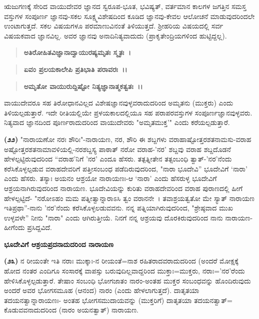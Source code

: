 
ಋಜುಗಣಕ್ಕೆ ಸೇರಿದ ವಾಯುದೇವರ ಜ್ಞಾನದ ಸ್ವರೂಪ-ಭೂತ, ಭವಿಷ್ಯತ್, ವರ್ತಮಾನ ಕಾಲಗಳ ಜಗತ್ತಿನ ಸಮಸ್ತ ವಸ್ತುಗಳ ಸಂಪೂರ್ಣ ಜ್ಞಾನವು-ಸಕಲ ಸೂಕ್ಷ್ಮವಿಶೇಷದಿಂದ ಕೂಡಿದ ಜ್ಞಾನವು-ಕೇವಲ ಆಲೋಚನೆ ಮಾಡುವುದರಿಂದಲೇ ಉಂಟಾಗುತ್ತದೆ. ಸಕಲ ವಿಷಯಗಳೂ ಪರಮಾಣುವಿನಂತೆ ತಿಳಿಯುತ್ತದೆ. ಶ‍್ರೀಹರಿಯ ವಿಷಯದಲ್ಲಿ ಸರ್ವ ವಿಷಯಕವಾದ ಜ್ಞಾನವಿಲ್ಲ. ಅವರ ಜ್ಞಾನವು ಅನಾದಿನಿತ್ಯವಾದುದು (ಪ್ರಾಕೃತೇಂದ್ರಿಯಗಳಿಂದ ಹುಟ್ಟಿದ್ದಲ್ಲ).

\begin{verse}
\textbf{ಅತಿರೋಹಿತವಿಜ್ಞಾನಾದ್ವಾಯುರಷ್ಯಮೃತಃ ಸ್ಮೃತಃ~।}
\end{verse}


\begin{verse}
\textbf{ಏವಂ ಪ್ರಲಯಕಾಲೇಪಿ ಪ್ರತಿಭಾತಿ ಪರಾವರಃ~।।}
\end{verse}


\begin{verse}
\textbf{ಅಮೃತೋ ವಾಯುರುದ್ದಿಷ್ಟೋ ನಿತ್ಯಜ್ಞಾನಾತ್ಮಕತ್ವತಃ~।।}
\end{verse}


\noindent
ವಾಯುದೇವರೂ ಸಹ ತಿರೋಧಾನವಿಲ್ಲದ ವಿಶೇಷಜ್ಞಾನವುಳ್ಳವರಾದುದರಿಂದ ಅಮೃತನು (ಮುಕ್ತರು) ಎಂದು ತಿಳಿಯಲ್ಪಡುತ್ತಾರೆ. ಇದೇ ರೀತಿಯಲ್ಲಿಯೇ ಪ್ರಳಯಕಾಲದಲ್ಲಿಯೂ ಸಹ ಪರಾಪರವಸ್ತುಗಳ ಸಂಪೂರ್ಣಜ್ಞಾನವುಳ್ಳವರು. ನಿತ್ಯವಾದ ಜ್ಞಾನದಿಂದ ಪೂರ್ಣರಾದುದರಿಂದ ವಾಯುದೇವರು "ಅಮೃತಮುಕ್ತ'" ಎಂದು ಕರೆಯಲ್ಪಡುತ್ತಾರೆ.

\textbf{(೨೨)} "ನಾರಾಯಣೋ ನರಃ ಶೌರಿಃ"-ನಾರಾಯಣ, ನರ, ಶೌರಿ ಈ ಶಬ್ದಗಳು ವರಾಹಾಷ್ಟೋತ್ತರಶತನಾಮಸು-ವರಾಹ ಅಷ್ಟೋತ್ತರಶತನಾಮಾವಳಿಯಲ್ಲಿ-ನರಶಬ್ದಸ್ಯ ಪಾಠಾತ್ ನರೋ ವರಾಹ-'ನರ' ಶಬ್ದವು ವರಾಹ ಶಬ್ದದೊಡನೆ ಹೇಳಲ್ಪಟ್ಟಿರುವುದರಿಂದ “ವರಾಹ'ನಿಗೆ 'ನರ' ಎಂದೂ ಹೆಸರು. ತತ್ಪತ್ನೀತೇನ ತತ್ಸಂಬಂಧಿ ತ್ವಾತ್-'ನರ'ನೆಂದು ಕರೆಸಿಕೊಳ್ಳಲ್ಪಡುವ ವರಾಹದೇವರಿಗೆ ಪತ್ತೀಸಂಬಂಧ ಪಡೆದಿರುವುದರಿಂದ, "ನಾರಾ ಭೂದೇವಿ'' ಭೂದೇವಿಗೆ `ನಾರಾ' ಎಂದು ಹೆಸರು. ತಸ್ಯಾಃ ಅಯನಂ ಆಶ್ರಯೋ ನಾರಾಯಣಃ-ಆ `ನಾರಾ' ಎಂದು ಹೆಸರುಳ್ಳ ಭೂದೇವಿಗೆ ಆಶ್ರಯನಾಗಿರುವುದರಿಂದ ನಾರಾಯಣ. ಭೂದೇವಿಯನ್ನು ಕುರಿತು ವರಾಹದೇವರಿಂದ ವರಾಹ ಪುರಾಣದಲ್ಲಿ ಹೀಗೆ ಹೇಳಲ್ಪಟ್ಟಿದೆ- "ನರೋಽಹಂ ಮಮ ಪತ್ನೀತ್ವಾನ್ನಾರಾಽಸಿ ತ್ವಂ ವರಾನನೇ~। ತವಾಶ್ರಯತ್ವತೋ ಮೇ ಸ್ಯಾತ್ ನಾರಾಯಣ ಇತಿ\break ಪ್ರಥಾ''-ನಾನು 'ನರ'ನೆಂದು ಕರೆಸಿಕೊಳ್ಳಲಡುವವನು. ನನ್ನ ಪತ್ನಿಯಾಗಿರುವುದರಿಂದ, "ಶ್ರೇಷ್ಠವಾದ ಮುಖ ಉಳ್ಳವಳೇ'' ನೀನು "ನಾರಾ" ಎಂದು ಆಗಿರುತ್ತೀಯೆ. ನಿನಗೆ ನನ್ನ ಆಶ್ರಯವು ದೊರಕಿರುವುದರಿಂದ ನಾನು ನಾರಾಯಣ- ಹೀಗೆಂದು ಪ್ರಸಿದ್ದವಿದೆ.

\begin{center}
\textbf{ಭೂದೇವಿಗೆ ಆಶ್ರಯಪ್ರದನಾದುದರಿಂದ ನಾರಾಯಣ}
\end{center}

\textbf{(೨೩)} ನ ರೀಯಂತೇ ಇತಿ ನರಾಃ ಮುಕ್ಕಾಃ-ನ ರೀಯಂತೆ=ನಾಶ ರಹಿತರಾದವರಾದುದರಿಂದ (ಅಂದರೆ ಮೋಕ್ಷಕ್ಕೆ ಹೋದ ನಂತರ ಎಂದಿಗೂ ಸಂಸಾರಕ್ಕೆ ವಾಪಸ್ಸು ಬರುವುದಿಲ್ಲವಾದ್ದರಿಂದ ಮುಕ್ತಾಃ=ಮುಕ್ತರು, ನರಾಃ='ನರ'ರೆಂದು ಹೇಳಿಸಿಕೊಳ್ಳಲ್ಪಡುತ್ತಾರೆ. ತೇಷಾಂ ಸಂಬಂಧಿ ಭೋಗಜಾತಂ ನಾರಂ-ಅಂತಹ ಮುಕ್ತರ ಸಂಬಂಧವನ್ನು ಹೊಂದಿರುವುದು ಅಂದರೆ ಅವರ ಭೋಗಸಮೂಹ (ಆನಂದ) ನಾರಂ (ಎಂದು ಹೇಳಲಾಗುತ್ತದೆ). ದಾತೃತಯಾ ತದಯನತ್ವಾನ್ನಾರಾಯಣಃ- ಅಂತಹ ಭೋಗಸಮುದಾಯವನ್ನು (ಮುಕ್ತರಿಗೆ) ದಾತೃತಯಾ ತದಯನತ್ವಾತ್= ಕೊಡುವವನಾದುದರಿಂದ (ನಾರಂ ಅಯನತ್ವಾತ್) ನಾರಾಯಣ.

